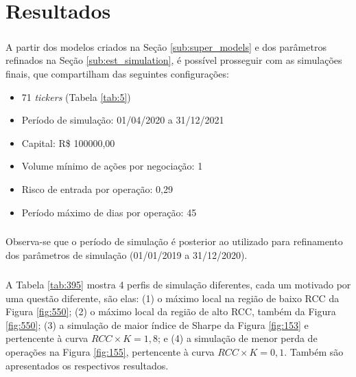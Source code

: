 \chapter{Resultados}
\label{cap4}



\paragraph{} A partir dos modelos criados na Seção \ref{sub:super_models} e dos parâmetros refinados na Seção \ref{sub:est_simulation}, é possível prosseguir com as simulações finais, que compartilham das seguintes configurações:

\begin{itemize}
    \item 71 \textit{tickers} (Tabela \ref{tab:5})
    \item Período de simulação: 01/04/2020 a 31/12/2021
    \item Capital: R\$ 100000,00
    \item Volume mínimo de ações por negociação: 1
    \item Risco de entrada por operação: 0,29
    \item Período máximo de dias por operação: 45
\end{itemize}

\paragraph{} Observa-se que o período de simulação é posterior ao utilizado para refinamento dos parâmetros de simulação (01/01/2019 a 31/12/2020).

\paragraph{} A Tabela \ref{tab:395} mostra 4 perfis de simulação diferentes, cada um motivado por uma questão diferente, são elas: (1) o máximo local na região de baixo RCC da Figura \ref{fig:550}; (2) o máximo local da região de alto RCC, também da Figura \ref{fig:550}; (3) a simulação de maior índice de Sharpe da Figura \ref{fig:153} e pertencente à curva \begin{math} RCC \times K = 1,8 \end{math}; e (4) a simulação de menor perda de operações na Figura \ref{fig:155}, pertencente à curva \begin{math} RCC \times K = 0,1 \end{math}. Também são apresentados os respectivos resultados.


